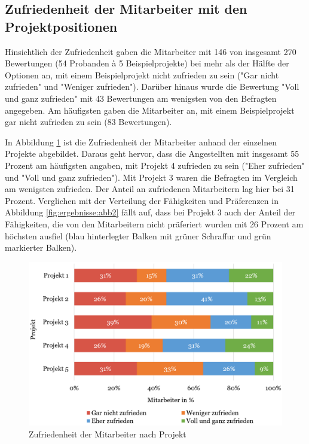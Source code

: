 \subsection{Zufriedenheit der Mitarbeiter mit den Projektpositionen}
Hinsichtlich der Zufriedenheit gaben die Mitarbeiter mit 146 von insgesamt 270 Bewertungen (54 Probanden \`{a} 5 Beispielprojekte) bei mehr als der Hälfte der Optionen an, mit einem Beispielprojekt nicht zufrieden zu sein ("Gar nicht zufrieden" und "Weniger zufrieden").
Darüber hinaus wurde die Bewertung "Voll und ganz zufrieden" mit 43 Bewertungen am wenigsten von den Befragten angegeben.
Am häufigsten gaben die Mitarbeiter an, mit einem Beispielprojekt gar nicht zufrieden zu sein (83 Bewertungen).

In Abbildung \ref{fig:ergebnisse:abb3} ist die Zufriedenheit der Mitarbeiter anhand der einzelnen Projekte abgebildet.
Daraus geht hervor, dass die Angestellten mit insgesamt 55 Prozent am häufigsten angaben, mit Projekt 4 zufrieden zu sein ("Eher zufrieden" und "Voll und ganz zufrieden").
Mit Projekt 3 waren die Befragten im Vergleich am wenigsten zufrieden.
Der Anteil an zufriedenen Mitarbeitern lag hier bei 31 Prozent.
Verglichen mit der Verteilung der Fähigkeiten und Präferenzen in Abbildung \ref{fig:ergebnisse:abb2} fällt auf, dass bei Projekt 3 auch der Anteil der Fähigkeiten, die von den Mitarbeitern nicht präferiert wurden mit 26 Prozent am höchsten ausfiel (blau hinterlegter Balken mit grüner Schraffur und grün markierter Balken).

\begin{figure}[H]
    \centering
	\includegraphics[width=1.0\textwidth]{gfx/verteilung-z-nach-projekt.png}
	\caption[Zufriedenheit der Mitarbeiter nach Projekt]{Zufriedenheit der Mitarbeiter nach Projekt}
	\label{fig:ergebnisse:abb3}
\end{figure}

